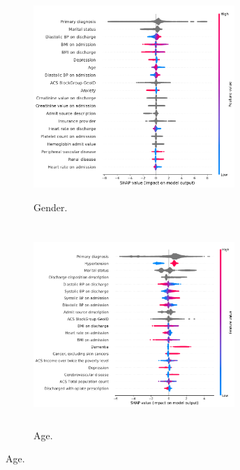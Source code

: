 \pagestyle{fancy}
\onecolumn{}
\begin{figure}
\begin{adjustbox}{minipage=7.0in,frame}
\vspace{2.5mm}
\centering

\begin{subfigure}[t]{.45\linewidth}
    \centering
    \captionsetup[subfigure]{}
    \caption{Gender.}\label{fig:shapsumgender}
    \includegraphics[height=3in,width=3in]{other/gender_SHAP_summary.pdf}
\end{subfigure}%
\hspace{5mm}%
\begin{subfigure}[t]{.45\linewidth}
    \centering
    \captionsetup[subfigure]{}
    \caption{Age.}\label{fig:shapsumage}
    \includegraphics[height=3in,width=3in]{other/age_SHAP_summary.pdf}
\end{subfigure}%


\end{adjustbox}
\end{figure}
